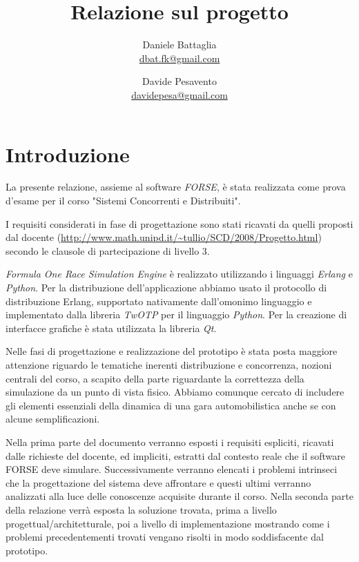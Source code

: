 \documentclass[11pt,a4paper]{report}
\title{Relazione sul progetto}
\author{Daniele Battaglia\\\url{dbat.fk@gmail.com}
	\and Davide Pesavento\\\url{davidepesa@gmail.com}}
\date{}
\begin{document}
\maketitle

\tableofcontents

\clearpage

\chapter{Introduzione}
La presente relazione, assieme al software \textsl{FORSE}, è stata realizzata come prova d'esame per il corso "Sistemi Concorrenti e Distribuiti".

I requisiti considerati in fase di progettazione sono stati ricavati da quelli proposti dal docente (\url{http://www.math.unipd.it/~tullio/SCD/2008/Progetto.html})
secondo le clausole di partecipazione di livello 3.

\textsl{Formula One Race Simulation Engine} è realizzato utilizzando i linguaggi \textsl{Erlang} e \textsl{Python}. Per la distribuzione dell'applicazione abbiamo
usato il protocollo di distribuzione Erlang, supportato nativamente dall'omonimo linguaggio e implementato dalla libreria \textsl{TwOTP} per il linguaggio
\textsl{Python}.
Per la creazione di interfacce grafiche è stata utilizzata la libreria \textsl{Qt}.

Nelle fasi di progettazione e realizzazione del prototipo è stata posta maggiore attenzione riguardo le tematiche inerenti distribuzione e concorrenza, nozioni
centrali del corso, a scapito della parte riguardante la correttezza della simulazione da un punto di vista fisico. Abbiamo comunque cercato di includere
gli elementi essenziali della dinamica di una gara automobilistica anche se con alcune semplificazioni.

Nella prima parte del documento verranno esposti i requisiti espliciti, ricavati dalle richieste del docente, ed impliciti, estratti dal contesto reale che il software FORSE deve simulare.
Successivamente verranno elencati i problemi intrinseci che la progettazione del sistema deve affrontare e questi ultimi verranno analizzati alla luce delle conoscenze acquisite durante il corso.
Nella seconda parte della relazione verrà esposta la soluzione trovata, prima a livello progettual/architetturale, poi a livello di implementazione mostrando come i problemi precedentementi trovati vengano risolti in modo soddisfacente dal prototipo.
\end{document}
